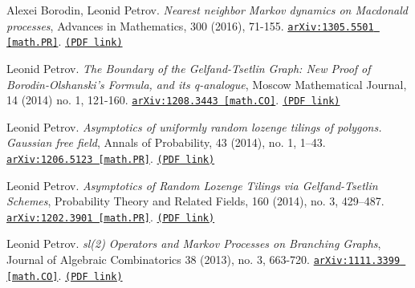 \documentclass[letterpaper,11pt]{article}
\begin{document}
\begin{etaremune}
\item 
Alexei Borodin, Leonid Petrov.
\emph{Nearest neighbor Markov dynamics on Macdonald processes}, Advances in Mathematics, 300 (2016), 71-155. 
\href{https://arxiv.org/abs/1305.5501}{\texttt{arXiv:1305.5501 [math.PR]}}. \href{https://storage.lpetrov.cc/research_files/Petrov-publ/12-publ-petrov.pdf}{\texttt{(PDF link)}}









\item 
Leonid Petrov.
\emph{The Boundary of the Gelfand-Tsetlin Graph: New Proof of Borodin-Olshanski’s Formula, and its q-analogue}, Moscow Mathematical Journal, 14 (2014) no. 1, 121-160. 
\href{https://arxiv.org/abs/1208.3443}{\texttt{arXiv:1208.3443 [math.CO]}}. \href{https://storage.lpetrov.cc/research_files/Petrov-publ/11-publ-petrov.pdf}{\texttt{(PDF link)}}



\item 
Leonid Petrov.
\emph{Asymptotics of uniformly random lozenge tilings of polygons. Gaussian free field}, Annals of Probability, 43 (2014), no. 1, 1–43. 
\href{https://arxiv.org/abs/1206.5123}{\texttt{arXiv:1206.5123 [math.PR]}}. \href{https://storage.lpetrov.cc/research_files/Petrov-publ/10-publ-petrov.pdf}{\texttt{(PDF link)}}





\item 
Leonid Petrov.
\emph{Asymptotics of Random Lozenge Tilings via Gelfand-Tsetlin Schemes}, Probability Theory and Related Fields, 160 (2014), no. 3, 429–487. 
\href{https://arxiv.org/abs/1202.3901}{\texttt{arXiv:1202.3901 [math.PR]}}. \href{https://storage.lpetrov.cc/research_files/Petrov-publ/09-publ-petrov.pdf}{\texttt{(PDF link)}}







\item 
Leonid Petrov.
\emph{sl(2) Operators and Markov Processes on Branching Graphs}, Journal of Algebraic Combinatorics 38 (2013), no. 3, 663-720. 
\href{https://arxiv.org/abs/1111.3399}{\texttt{arXiv:1111.3399 [math.CO]}}. \href{https://storage.lpetrov.cc/research_files/Petrov-publ/08-publ-petrov.pdf}{\texttt{(PDF link)}}








\end{etaremune}
\end{document}
